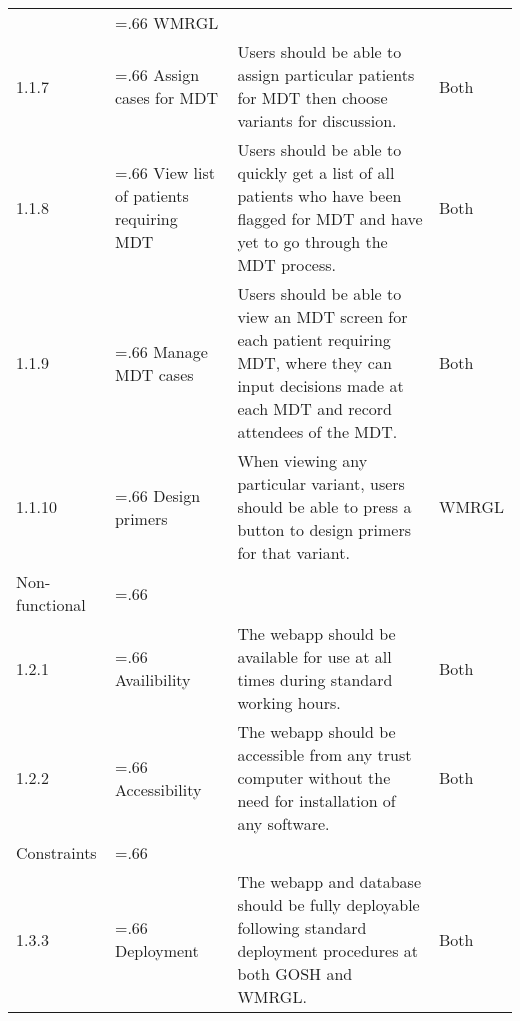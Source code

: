 \documentclass[a4paper, 10pt]{article}
\begin{document}
\begin{table}[h]
\begin{tabularx}{\textwidth}{@{}l>{\hsize=.66\hsize}X>{\hsize=1.33\hsize}Xl@{}}
& WMRGL
\\
1.1.7
& Assign cases for MDT
& Users should be able to assign particular patients for MDT then choose variants for discussion.
& Both
\\
1.1.8
& View list of patients requiring MDT
& Users should be able to quickly get a list of all patients who have been flagged for MDT and have yet to go through the MDT process.
& Both
\\
1.1.9
& Manage MDT cases
& Users should be able to view an MDT screen for each patient requiring MDT, where they can input decisions made at each MDT and record attendees of the MDT.
& Both
\\
1.1.10
& Design primers
& When viewing any particular variant, users should be able to press a button to design primers for that variant.
& WMRGL
\\
\rowcolor[HTML]{C0C0C0} 
Non-functional
&
&                                                                                                                           &
\\
1.2.1
& Availibility
& The webapp should be available for use at all times during standard working hours.
& Both
\\
1.2.2
& Accessibility
& The webapp should be accessible from any trust computer without the need for installation of any software.
& Both
\\
\rowcolor[HTML]{C0C0C0}
Constraints
&
&                                                                                                                           &
\\
1.3.3
& Deployment
& The webapp and database should be fully deployable following standard deployment procedures at both GOSH and WMRGL.   
& Both
\\ 
\bottomrule
\end{tabularx}
\end{table}
\end{document}
